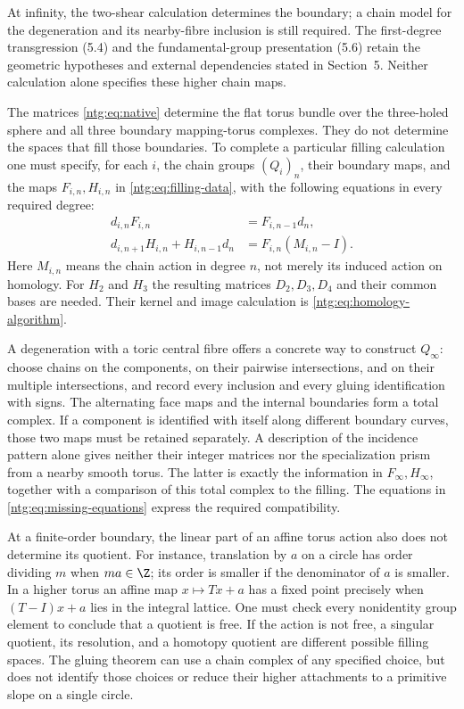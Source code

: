 At infinity, the two-shear calculation determines the boundary;
a chain model for the degeneration and its nearby-fibre inclusion
is still required. The first-degree transgression (5.4) and the
fundamental-group presentation (5.6) retain the geometric hypotheses
and external dependencies stated in Section~5. Neither calculation
alone specifies these higher chain maps.

The matrices \eqref{ntg:eq:native} determine the flat torus bundle over
the three-holed sphere and all three boundary mapping-torus complexes.
They do not determine the spaces that fill those boundaries.
To complete a particular filling calculation one must specify, for
each $i$, the chain groups $(Q_i)_n$, their boundary maps, and
the maps $F_{i,n},H_{i,n}$ in \eqref{ntg:eq:filling-data}, with the
following equations in every required degree:
\begin{equation}\label{ntg:eq:missing-equations}
 \begin{split}
 d_{i,n}F_{i,n}&=F_{i,n-1}d_n,\\
 d_{i,n+1}H_{i,n}+H_{i,n-1}d_n
     &=F_{i,n}(M_{i,n}-I).
 \end{split}
\end{equation}
Here $M_{i,n}$ means the chain action in degree $n$, not merely
its induced action on homology. For $H_2$ and $H_3$ the resulting
matrices $D_2,D_3,D_4$ and their common bases are needed. Their
kernel and image calculation is \eqref{ntg:eq:homology-algorithm}.

A degeneration with a toric central fibre offers a concrete way to
construct $Q_\infty$: choose chains on the components, on their
pairwise intersections, and on their multiple intersections, and
record every inclusion and every gluing identification with signs.
The alternating face maps and the internal boundaries form a total
complex. If a component is identified with itself along different
boundary curves, those two maps must be retained separately. A
description of the incidence pattern alone gives neither their
integer matrices nor the specialization prism from a nearby smooth
torus. The latter is exactly the information in
$F_\infty,H_\infty$, together with a comparison of this total
complex to the filling. The equations in
\eqref{ntg:eq:missing-equations} express the required compatibility.

At a finite-order boundary, the linear part of an affine torus action
also does not determine its quotient. For instance, translation by
$a$ on a circle has order dividing $m$ when $ma\in\Z$; its
order is smaller if the denominator of $a$ is smaller. In a higher
torus an affine map $x\mapsto Tx+a$ has a fixed point precisely
when $(T-I)x+a$ lies in the integral lattice. One must check every
nonidentity group element to conclude that a quotient is free.
If the action is not free, a singular quotient, its resolution, and
a homotopy quotient are different possible filling spaces. The
gluing theorem can use a chain complex of any specified choice, but
does not identify those choices or reduce their higher attachments
to a primitive slope on a single circle.

